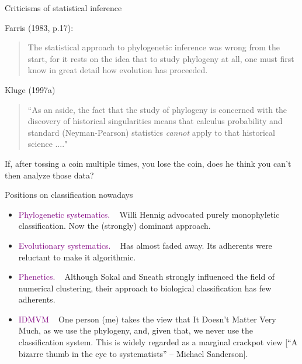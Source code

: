 \documentclass[bluish,slideColor,colorBG,pdf]{prosper}
\begin{document}
\begin{slide}[Replace]{Criticisms of statistical inference}

{\parindent=0in

Farris (1983, p.17):

\begin{quote}
The statistical approach to phylogenetic inference was wrong from the
start, for it rests on the idea that to study phylogeny at all, one must
first know in great detail how evolution has proceeded.
\end{quote}
\bigskip

Kluge (1997a)

\begin{quote}
``As an aside, the fact that the study of phylogeny is concerned with the
discovery of historical singularities means that calculus probability and
standard (Neyman-Pearson) statistics {\it cannot} apply to that historical
science ...."
\end{quote}
}

If, after tossing a coin multiple times, you lose the coin, does he think you
can't then analyze those data?

\end{slide}

\begin{slide}[Replace]{Positions on classification nowadays}

\begin{itemize}
\item \textcolor{purple}{Phylogenetic systematics.} ~ Willi Hennig advocated purely monophyletic
classification.  Now the (strongly) dominant approach.
\item \textcolor{purple}{Evolutionary systematics.} ~ Has almost faded away.  Its adherents were
reluctant to make it algorithmic.
\item \textcolor{purple}{Phenetics.} ~ Although Sokal and Sneath strongly influenced the field of
numerical clustering, their approach to biological classification has few
adherents.
\item \textcolor{purple}{IDMVM} ~ One person (me) takes the view that It Doesn't Matter Very Much,
as we use the phylogeny, and, given that, we never use the classification
system.  This is widely regarded as a marginal crackpot view [``A bizarre
thumb in the eye to systematists'' -- Michael Sanderson].
\end{itemize}

\end{slide}
\end{document}
